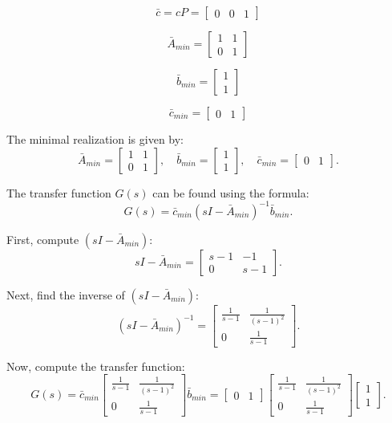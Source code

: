 \documentclass[12pt]{article}
\begin{document}
\[
\bar{c} = cP = \begin{bmatrix} 0 & 0 & 1\end{bmatrix}
\]


\[
\bar{A}_{min} = \begin{bmatrix}
1 & 1 \\
0 & 1
\end{bmatrix}
\]

\[
\bar{b}_{min} = \begin{bmatrix}
1 \\ 1
\end{bmatrix}
\]

\[
\bar{c}_{min} = \begin{bmatrix}
0 & 1
\end{bmatrix}
\]

The minimal realization is given by:
\[
\bar{A}_{min} = \begin{bmatrix}
1 & 1 \\
0 & 1
\end{bmatrix}, \quad
\bar{b}_{min} = \begin{bmatrix}
1 \\ 1
\end{bmatrix}, \quad
\bar{c}_{min} = \begin{bmatrix}
0 & 1
\end{bmatrix}.
\]

The transfer function \( G(s) \) can be found using the formula:
\[
G(s) = \bar{c}_{min} (sI - \bar{A}_{min})^{-1} \bar{b}_{min}.
\]

First, compute \( (sI - \bar{A}_{min}) \):
\[
sI - \bar{A}_{min} = \begin{bmatrix}
s-1 & -1 \\
0 & s-1
\end{bmatrix}.
\]

Next, find the inverse of \( (sI - \bar{A}_{min}) \):
\[
(sI - \bar{A}_{min})^{-1} = \begin{bmatrix}
\frac{1}{s-1} & \frac{1}{(s-1)^2} \\
0 & \frac{1}{s-1}
\end{bmatrix}.
\]

Now, compute the transfer function:
\[
G(s) = \bar{c}_{min} \begin{bmatrix}
\frac{1}{s-1} & \frac{1}{(s-1)^2} \\
0 & \frac{1}{s-1}
\end{bmatrix} \bar{b}_{min} = \begin{bmatrix}
0 & 1
\end{bmatrix} \begin{bmatrix}
\frac{1}{s-1} & \frac{1}{(s-1)^2} \\
0 & \frac{1}{s-1}
\end{bmatrix} \begin{bmatrix}
1 \\ 1
\end{bmatrix}.
\]
\end{document}
